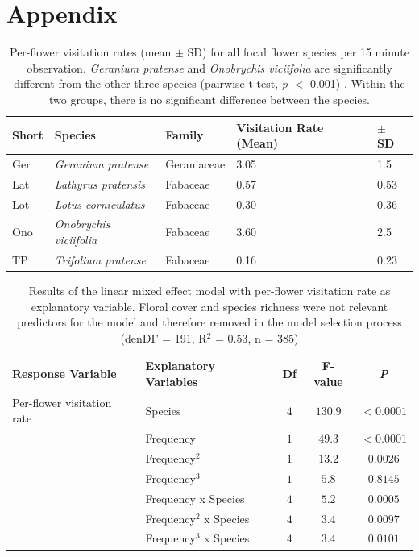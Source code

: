 \label{ch:appendix_ABM}

\section{Appendix}


\begin{table}[!htbp] %
	\centering
	\caption{Per-flower visitation rates (mean $\pm$ SD) for all focal flower species per 15 minute observation. \textit{Geranium pratense} and \textit{Onobrychis viciifolia} are significantly different from the other three species (pairwise t-test, \textit{p} $<$ 0.001) . Within the two groups, there is no significant difference between the species. }
	\begin{tabular}{l l l l l}
		\toprule
		\textbf {Short} & \textbf{Species} & \textbf{Family} &\textbf{Visitation Rate (Mean)} & \textbf{ $\pm$ SD} \\
		\midrule
		Ger  & \textit{Geranium pratense} & Geraniaceae & 3.05 & 1.5 \\ %
		Lat  & \textit{Lathyrus pratensis} & Fabaceae & 0.57 & 0.53 \\ %
		Lot  & \textit{Lotus corniculatus} & Fabaceae & 0.30 & 0.36 \\  %
		Ono  & \textit{Onobrychis viciifolia} & Fabaceae & 3.60  &  2.5 \\ %
		TP   & \textit{Trifolium pratense} & Fabaceae & 0.16 & 0.23 \\ %
		\bottomrule
	\end{tabular}%
	\label{tab:VR_spec}
\end{table}%

\begin{table} [!htbp] %
	\centering
	\caption{Results of the linear mixed effect model with per-flower visitation rate as explanatory variable. Floral cover and species richness were not relevant predictors for the model and therefore removed in the model selection process (denDF = 191, R$^{2}$ = 0.53, n = 385)}
	\begin{tabular} { l l c c c}
		\toprule
		\textbf{Response Variable} & \textbf{Explanatory Variables} & \textbf{Df} & \textbf{F-value} & \textbf{\textit{P}} \\
		\midrule
		Per-flower visitation rate   & Species & $4$ & $130.9$ & $<0.0001$\\
		& Frequency 			&  $1$ & $49.3$ & $<0.0001$ \\
		& Frequency$^{2}$ 		&  $1$ & $13.2$ & $0.0026$ \\
		& Frequency$^{3}$ 		&  $1$ & $ 5.8$ &  $0.8145$ \\
		& Frequency x Species &  $4$ & $ 5.2$ &  $0.0005$ \\
		& Frequency$^{2}$ x Species & $4$ & $3.4$ & $0.0097$\\
		& Frequency$^{3}$ x Species & $4$ & $3.4$ & $0.0101$\\
		\bottomrule
	\end{tabular}
	\label{tab:anova}
\end{table}

